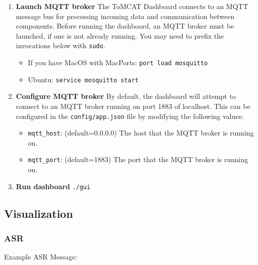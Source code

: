 \begin{enumerate}

    \item \textbf{Launch MQTT broker} The ToMCAT Dashboard connects to an MQTT
        message bus for processing incoming data and communication between
        components. Before running the dashboard, an MQTT broker must be
        launched, if one is not already running.  You may need to prefix the
        invocations below with \texttt{sudo}.

        \begin{itemize}
            \item If you have MacOS with MacPorts: \texttt{port load mosquitto}
            \item Ubuntu: \texttt{service mosquitto start}
        \end{itemize}

    \item \textbf{Configure MQTT broker} By default, the dashboard will attempt
        to connect to an MQTT broker running on port 1883 of localhost. This
        can be configured in the \texttt{config/app.json} file by modifying the
        following values:

        \begin{itemize}

            \item \texttt{mqtt\_host}: (default=0.0.0.0) The host that the MQTT broker
                is running on.

            \item \texttt{mqtt\_port}: (default=1883) The port that the MQTT broker is
                running on.

        \end{itemize}

    \item \textbf{Run dashboard} \texttt{./gui}
\end{enumerate}


\subsection{Visualization}

\subsubsection{ASR}

Example ASR Message:


